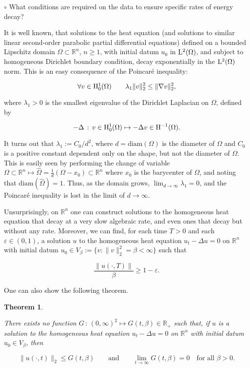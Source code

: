 \documentclass{amsart}
\newtheorem {Theorem}  {Theorem}
\numberwithin{Theorem}{section}
\numberwithin{equation}{section}
\theoremstyle{definition}
\theoremstyle{remark}
\begin{document}
$\circ$ What conditions are required on the data to ensure specific rates of energy decay?

\medskip 

It is well known, that solutions to the heat equation (and solutions to similar linear second-order parabolic partial differential equations) defined on a bounded Lipschitz domain  $\Omega\subset \mathbb{R}^n$, $n \geq 1$, with initial datum $u_0$ in ${{\rm L}}^2(\Omega)$, and subject to homogeneous Dirichlet boundary condition, decay exponentially in the ${{\rm L}}^2(\Omega)$ norm. This is an easy consequence of the Poincar\'{e} inequality:

\[ \mbox{$\forall v \in {{\rm H}}^1_0(\Omega)$}\qquad \lambda_1 \|v\|_2^2 \leq \|\nabla v\|_2^2, \]

where $\lambda_1>0$ is the smallest eigenvalue of the Dirichlet Laplacian on $\Omega$, defined by

\[-\Delta \,:\, v \in  {{\rm H}}^1_0(\Omega) \mapsto -\Delta v \in {{\rm H}}^{-1}(\Omega).\]

It turns out that  $\lambda_1 := C_0/d^2$, where $d= \mbox{diam}(\Omega)$ is the diameter of $\Omega$ and $C_0$ is a positive constant dependent only on the shape, but not the diameter of $\Omega$. This is easily seen by performing the change of variable $\Omega \subset \mathbb{R}^n \mapsto \hat{\Omega} = \frac{1}{d}(\Omega - x_0)\subset \mathbb{R}^n$ where $x_0$ is the barycenter of $\Omega$, and noting that $\mbox{diam}(\hat{\Omega})=1$. Thus, as  the domain grows, $\lim_{d \rightarrow \infty} \lambda_1 = 0$, and the Poincar\'{e} inequality is lost in the limit of $d \rightarrow \infty$.

Unsurprisingly, on $\mathbb{R}^n$ one can construct solutions to the homogeneous heat equation that decay at a very slow algebraic rate, and even ones that decay but without any rate. Moreover, we can find, for each time $T>0$  and each $\varepsilon \in (0,1)$, a solution $u$ to the homogeneous heat equation $u_t - \Delta u = 0$ on $\mathbb{R}^n$ with initial datum $u_0 \in V_{\beta} := \{ v: \| v \|_2^2 = \beta <\infty\}$ such that

\[ \frac{\|u(\cdot,T)\|}{\beta} \geq 1-\varepsilon.\]

One can also show the following theorem.

\begin{Theorem} \label{theo:norate}

There exists no function $G\,:\,(0,\infty)^2 \mapsto G(t,\beta)\in \mathbb{R}_+$ such that, if $u$ is a solution to the homogeneous heat equation $u_t - \Delta u = 0$ on $ \mathbb{R}^n$ with initial datum  $u_0 \in V_{\beta}$, then

\[\|u(\cdot,t)\|_2\leq G(t,\beta) \qquad \mbox{and}\qquad \lim_{t\rightarrow\infty}G(t,\beta)= 0 \quad \mbox{for all $\beta>0$}.
\]

\end{Theorem}
\end{document}
